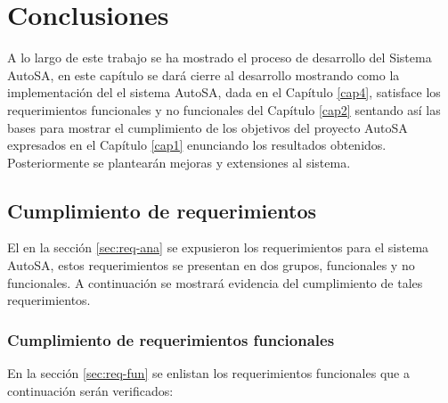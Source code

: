 \chapter{Conclusiones}\label{cap5}

A lo largo de este trabajo se ha mostrado el proceso de desarrollo del Sistema AutoSA, en este capítulo se dará cierre al desarrollo mostrando como la implementación del el sistema AutoSA, dada en el Capítulo \ref{cap4}, satisface los requerimientos funcionales y no funcionales del Capítulo \ref{cap2} sentando así las bases para mostrar el cumplimiento de los objetivos del proyecto AutoSA expresados en el Capítulo \ref{cap1} enunciando los resultados obtenidos. Posteriormente se plantearán mejoras y extensiones al sistema.  

\section{Cumplimiento de requerimientos}
El en la sección \ref{sec:req-ana} se expusieron los requerimientos para el sistema AutoSA, estos requerimientos se presentan en dos grupos, funcionales y no funcionales. A continuación se mostrará evidencia del cumplimiento de tales requerimientos.

\subsection{Cumplimiento de requerimientos funcionales}
En la sección \ref{sec:req-fun} se enlistan los requerimientos funcionales que a continuación serán verificados:

